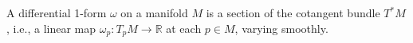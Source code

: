 A differential 1-form $\omega$ on a manifold $M$ is a section of the cotangent bundle $T^*M$, i.e., a linear map $\omega_p: T_p M \to \mathbb{R}$ at each $p \in M$, varying smoothly.